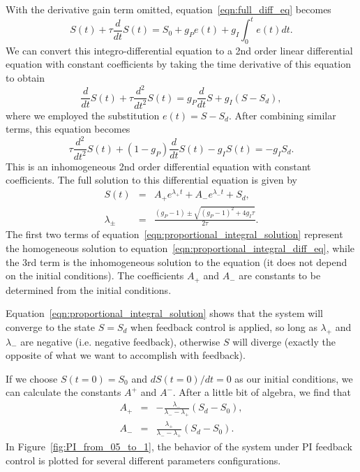 \documentclass{article}
\begin{document}
With the derivative gain term omitted, equation~\ref{eqn:full_diff_eq} becomes
\begin{equation}
S(t) + \tau \frac{d}{dt} S(t) = S_0 + g_P e(t) + g_I \int_0^t e(t)dt.
\end{equation}
We can convert this integro-differential equation to a 2nd order linear differential equation with constant coefficients by taking the time derivative of this equation to obtain
\begin{equation}
\frac{d}{dt} S(t) + \tau \frac{d^2}{dt^2} S(t) = g_P \frac{d}{dt} S + g_I (S - S_d),
\end{equation}
where we employed the substitution $e(t) = S - S_d$. After combining similar terms, this equation becomes
\begin{equation}
\tau \frac{d^2}{dt^2} S(t) + (1 - g_P) \frac{d}{dt} S(t) - g_I S(t) = - g_I S_d. \label{eqn:proportional_integral_diff_eq}
\end{equation}
This is an inhomogeneous 2nd order differential equation with constant coefficients. The full solution to this differential equation is given by
\begin{eqnarray}
S(t) & = & A_+ e^{\lambda_+ t} + A_- e^{\lambda_- t} + S_d, \label{eqn:proportional_integral_solution} \\
\lambda_\pm & = & \frac{(g_P - 1) \pm \sqrt{(g_P - 1)^2 + 4 g_I \tau}}{2 \tau}.
\end{eqnarray}
The first two terms of equation~\ref{eqn:proportional_integral_solution} represent the homogeneous solution to equation~\ref{eqn:proportional_integral_diff_eq}, while the 3rd term is the inhomogeneous solution to the equation (it does not depend on the initial conditions).  The coefficients $A_+$ and $A_-$ are constants to be determined from the initial conditions.

Equation~\ref{eqn:proportional_integral_solution} shows that the system will converge to the state $S = S_d$ when feedback control is applied, so long as $\lambda_+$ and $\lambda_-$ are negative (i.e. negative feedback), otherwise $S$ will diverge (exactly the opposite of what we want to accomplish with feedback).

If we choose $S(t=0) = S_0$ and $dS(t=0)/dt = 0$ as our initial conditions, we can calculate the constants $A^+$ and $A^-$. After a little bit of algebra, we find that
\begin{eqnarray}
A_+ & = & - \frac{\lambda_-}{\lambda_- - \lambda_+} (S_d - S_0), \\
A_- & = & \frac{\lambda_+}{\lambda_- - \lambda_+} (S_d - S_0).
\end{eqnarray}
In Figure~\ref{fig:PI_from_05_to_1}, the behavior of the system under PI feedback control is plotted for several different parameters configurations.
\end{document}
